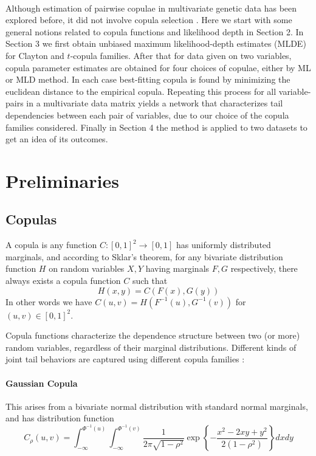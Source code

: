 \documentclass[11pt]{llncs}
\begin{document}
\paragraph{}Although estimation of pairwise copulae in multivariate genetic data has been explored before, it did not involve copula selection \cite{paircop}. Here we start with some general notions related to copula functions and likelihood depth in Section 2. In Section 3 we first obtain unbiased maximum likelihood-depth estimates (MLDE) for Clayton and $t$-copula families. After that for data given on two variables, copula parameter estimates are obtained for four choices of copulae, either by ML or MLD method. In each case best-fitting copula is found by minimizing the euclidean distance to the empirical copula. Repeating this process for all variable-pairs in a multivariate data matrix yields a network that characterizes tail dependencies between each pair of variables, due to our choice of the copula families considered. Finally in Section 4 the method is applied to two datasets to get an idea of its outcomes.

\section{Preliminaries}
\subsection{Copulas}A copula is any function $C:[0,1]^2\rightarrow [0,1]$ has uniformly distributed marginals, and according to Sklar's theorem, for any bivariate distribution function $H$ on random variables $X,Y$ having marginals $F,G$ respectively, there always exists a copula function $C$ such that
$$ H(x,y) = C(F(x),G(y)) $$
In other words we have $C(u,v) = H(F^{-1}(u), G^{-1}(v))$ for $(u,v)\in[0,1]^2$.

Copula functions characterize the dependence structure between two (or more) random variables, regardless of their marginal distributions. Different kinds of joint tail behaviors are captured using different copula families \cite{4copulas}:
\paragraph{Gaussian Copula} This arises from a bivariate normal distribution with standard normal marginals, and has distribution function
$$ C_\rho(u,v) = \int_{-\infty}^{\Phi^{-1}(u)}\int_{-\infty}^{\Phi^{-1}(v)} \frac{1}{2\pi\sqrt{1-\rho^2}} \exp\left\{-\frac{x^2-2xy+y^2}{2(1-\rho^2)}\right\}dxdy$$
\end{document}
